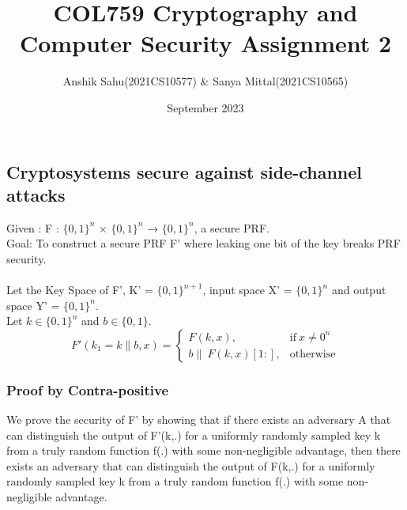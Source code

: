 \documentclass{article}
\title{\textbf{COL759 Cryptography and Computer Security Assignment 2}}
\author{Anshik Sahu(2021CS10577) \& Sanya Mittal(2021CS10565)}
\date{September 2023}
\begin{document}
\maketitle
\tableofcontents
\newpage
\section{}
\subsection{Cryptosystems secure against side-channel attacks}
Given : F : $\{0,1\}^n$ × $\{0,1\}^n$ → $\{0,1\}^n$, a secure PRF. \\
Goal: To construct a secure PRF F' where leaking one bit of the key breaks PRF security. \\ \\ 
Let the Key Space of F', K' = $\{0,1\}^{n+1}$, input space X' = $\{0,1\}^n$ and output space Y' = $\{0,1\}^n$. \\
Let $k \in \{0,1\}^n$ and $b \in \{0,1\}$.
 \\

$$ F'(k_1 = k \| b,x) = 
    \begin{cases}
      {F(k,x)}, & \text{if}\ {x \neq 0^n}\\
      {b\|\ F(k,x)[1:]}, & \text{otherwise}
    \end{cases} $$

\subsubsection{Proof by Contra-positive}
We prove the security of F' by showing that if there exists an adversary A that can distinguish the output of F'(k,.) for a uniformly randomly sampled key k from a truly random function f(.) with some non-negligible advantage, then there exists an adversary that can distinguish the output of F(k,.) for a uniformly randomly sampled key k from a truly random function f(.) with some non-negligible advantage. \\ \\ \\
\end{document}

